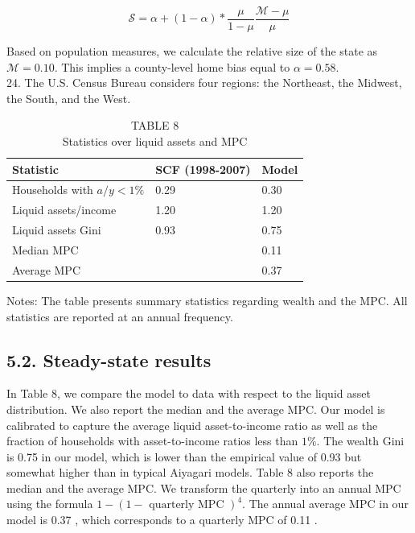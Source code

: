 \documentclass[10pt]{article}
\begin{document}
$$
\mathcal{S}=\alpha+(1-\alpha) * \frac{\mu}{1-\mu} \frac{\mathcal{M}-\mu}{\mu}
$$

Based on population measures, we calculate the relative size of the state as $\mathcal{M}=0.10$. This implies a county-level home bias equal to $\alpha=0.58$.\\
24. The U.S. Census Bureau considers four regions: the Northeast, the Midwest, the South, and the West.

\begin{table}[h]
\begin{center}
\captionsetup{labelformat=empty}
\caption{TABLE 8\\
Statistics over liquid assets and MPC}
\begin{tabular}{|l|l|l|}
\hline
Statistic & SCF (1998-2007) & Model \\
\hline
Households with $a / y<1 \%$ & 0.29 & 0.30 \\
\hline
Liquid assets/income & 1.20 & 1.20 \\
\hline
Liquid assets Gini & 0.93 & 0.75 \\
\hline
Median MPC &  & 0.11 \\
\hline
Average MPC &  & 0.37 \\
\hline
\end{tabular}
\end{center}
\end{table}

Notes: The table presents summary statistics regarding wealth and the MPC. All statistics are reported at an annual frequency.

\subsection*{5.2. Steady-state results}
In Table 8, we compare the model to data with respect to the liquid asset distribution. We also report the median and the average MPC. Our model is calibrated to capture the average liquid asset-to-income ratio as well as the fraction of households with asset-to-income ratios less than $1 \%$. The wealth Gini is 0.75 in our model, which is lower than the empirical value of 0.93 but somewhat higher than in typical Aiyagari models. Table 8 also reports the median and the average MPC. We transform the quarterly into an annual MPC using the formula $1-(1-\text { quarterly MPC })^{4}$. The annual average MPC in our model is 0.37 , which corresponds to a quarterly MPC of 0.11 .
\end{document}
